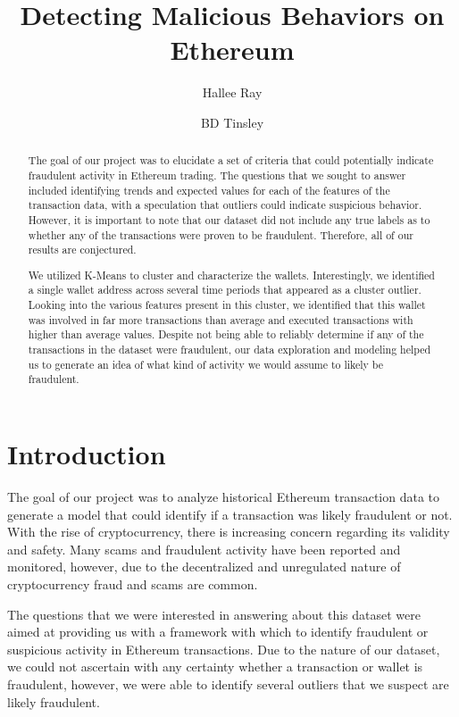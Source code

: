 \documentclass[sigconf]{acmart}
\title{Detecting Malicious Behaviors on Ethereum}
\author{Hallee Ray}
\affiliation{%
  \department{Computer Science Post Bacc.}
  \institution{University of Colorado - Boulder}
  \city{Boulder}
  \state{Colorado}
  \country{USA}
  \postcode{ZIP code}
}
\author{BD Tinsley}
\affiliation{%
  \department{Computer Science Post Bacc.}
  \institution{University of Colorado - Boulder}
  \city{Boulder}
  \state{Colorado}
  \country{USA}
  \postcode{ZIP code}
}
\begin{document}
\begin{abstract}
The goal of our project was to elucidate a set of criteria that could potentially indicate fraudulent activity in Ethereum trading. The questions that we sought to answer included identifying trends and expected values for each of the features of the transaction data, with a speculation that outliers could indicate suspicious behavior. However, it is important to note that our dataset did not include any true labels as to whether any of the transactions were proven to be fraudulent. Therefore, all of our results are conjectured. 

We utilized K-Means to cluster and characterize the wallets. Interestingly, we identified a single wallet address across several time periods that appeared as a cluster outlier. Looking into the various features present in this cluster, we identified that this wallet was involved in far more transactions than average and executed transactions with higher than average values. Despite not being able to reliably determine if any of the transactions in the dataset were fraudulent, our data exploration and modeling helped us to generate an idea of what kind of activity we would assume to likely be fraudulent. 
\end{abstract}


\maketitle

\section{Introduction}

The goal of our project was to analyze historical Ethereum transaction data to generate a model that could identify if a transaction was likely fraudulent or not. With the rise of cryptocurrency, there is increasing concern regarding its validity and safety. Many scams and fraudulent activity have been reported and monitored, however, due to the decentralized and unregulated nature of cryptocurrency fraud and scams are common.

The questions that we were interested in answering about this dataset were aimed at providing us with a framework with which to identify fraudulent or suspicious activity in Ethereum transactions. Due to the nature of our dataset, we could not ascertain with any certainty whether a transaction or wallet is fraudulent, however, we were able to identify several outliers that we suspect are likely fraudulent. 
\end{document}
